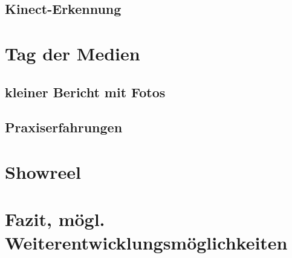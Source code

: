 \subsection{Kinect-Erkennung}


\clearpage
\section{Tag der Medien}
\subsection{kleiner Bericht mit Fotos}
\subsection{Praxiserfahrungen}

\clearpage
\section{Showreel}

\clearpage
\section{Fazit, mögl. Weiterentwicklungsmöglichkeiten}


